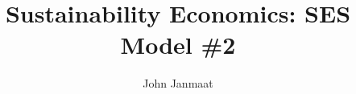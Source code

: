 \documentclass[10pt, aspectratio=169]{beamer}
\title{Sustainability Economics: SES Model \#2}
\author{John Janmaat}
\begin{document}
	
	\frame{\titlepage}
	
	
	
\end{document}
